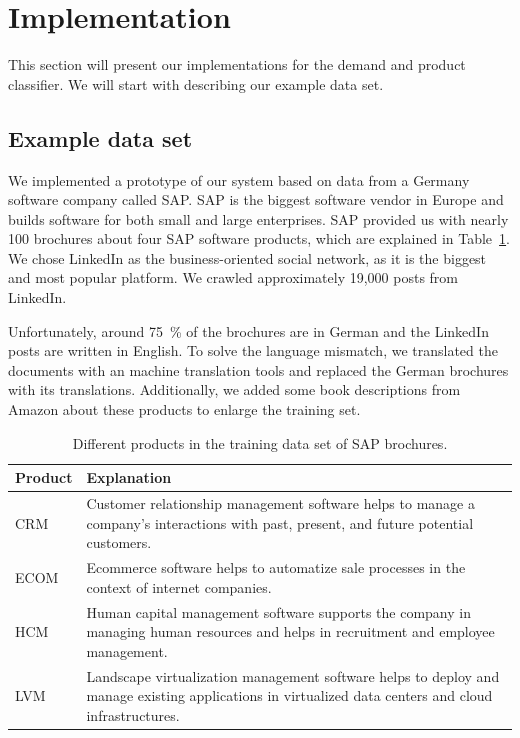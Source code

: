 
\section{Implementation}
\label{sec:implementation}

This section will present our implementations for the demand and product classifier.
We will start with describing our example data set.

\subsection{Example data set}
\label{sub:initial_data_set}
We implemented a prototype of our \nto system based on data from a Germany software company called SAP.
SAP is the biggest software vendor in Europe and builds software for both small and large enterprises.
SAP provided us with nearly 100 brochures about four SAP software products, which are explained in Table~\ref{table:products}.
We chose LinkedIn as the business-oriented social network, as it is the biggest and most popular platform.
We crawled approximately 19,000 posts from LinkedIn.

Unfortunately, around 75~\% of the brochures are in German and the LinkedIn posts are written in English.
To solve the language mismatch, we translated the documents with an machine translation tools and replaced the German brochures with its translations.
Additionally, we added some book descriptions from Amazon about these products to enlarge the training set.

\begin{table}[h]
	\centering
	{
		\renewcommand\arraystretch{1.25}
		\begin{tabular}{lll}
			\hline
			\textbf{Product} & \multicolumn{2}{l}{\textbf{Explanation}} \\
			\hline\hline
			CRM  & \multicolumn{2}{p{10cm}}{\raggedright
				Customer relationship management software helps to manage a company's interactions with past, present, and future potential customers.} \\
			\hline
			ECOM  & \multicolumn{2}{p{10cm}}{\raggedright
				Ecommerce software helps to automatize sale processes in the context of internet companies.} \\
			\hline
			HCM  & \multicolumn{2}{p{10cm}}{\raggedright
				Human capital management software supports the company in managing human resources and helps in recruitment and employee management.} \\
			\hline
			LVM  & \multicolumn{2}{p{10cm}}{\raggedright
				Landscape virtualization management software helps to deploy and manage existing applications in virtualized data centers and cloud infrastructures.} \\
			\hline
		\end{tabular}
	}
	\caption{Different products in the training data set of SAP brochures.}
	\label{table:products}
\end{table}

